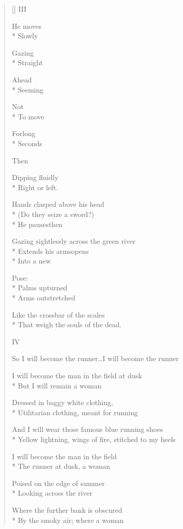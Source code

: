 \begin{verse}[\versewidth]
\hspace{0.45\versewidth} III

He moves\\*
Slowly 

Gazing\\*
Straight

Ahead\\*
Seeming

Not\\*
To move

For\quad long\\*
Seconds

Then

Dipping fluidly\\*
Right or left.

Hands clasped above his head\\*
(Do they seize a sword?)\\*
He pauses\qquad then

Gazing sightlessly across the green river\\*
Extends his arms\quad opens\\*
Into a new

Pose:\\*
Palms upturned\\*
Arms outstretched

Like the crossbar of the scales\\*
That weigh the souls of the dead.

\hspace{0.45\versewidth} IV

So I will become the runner\ldots I will become the runner

I will become the man in the field at dusk\\*
But I will remain a woman

Dressed in baggy white clothing,\\*
Utilitarian clothing, meant for running

And I will wear those famous blue running shoes\\*
Yellow lightning, wings of fire, stitched to my heels

I will become the man in the field\\*
The runner at dusk, a woman

Poised on the edge of summer\\*
Looking across the river

Where the further bank is obscured\\*
By the smoky air; where a woman


\end{verse}

